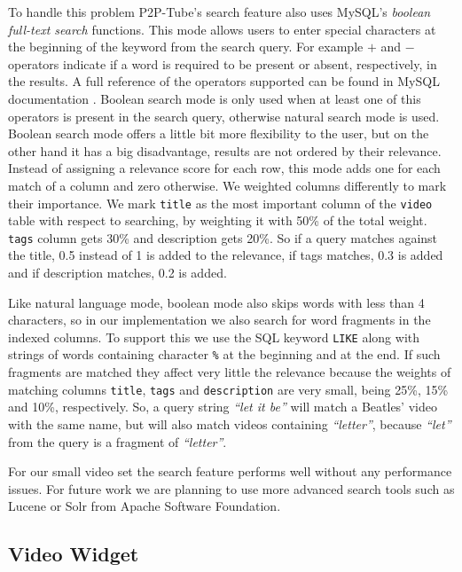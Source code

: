 To handle this problem P2P-Tube's search feature also uses MySQL's \textit{boolean full-text search} functions. This mode allows users to enter special characters at the beginning of the keyword from the search query. For example $+$ and $-$ operators indicate if a word is required to be present or absent, respectively, in the results. A full reference of the operators supported can be found in MySQL documentation \cite{mysql-boolean-search}. Boolean search mode is only used when at least one of this operators is present in the search query, otherwise natural search mode is used. Boolean search mode offers a little bit more flexibility to the user, but on the other hand it has a big disadvantage, results are not ordered by their relevance. Instead of assigning a relevance score for each row, this mode adds one for each match of a column and zero otherwise. We weighted columns differently to mark their importance. We mark \texttt{title} as the most important column of the \texttt{video} table with respect to searching, by weighting it with 50\% of the total weight. \texttt{tags} column gets 30\% and description gets 20\%. So if a query matches against the title, 0.5 instead of 1 is added to the relevance, if tags matches, 0.3 is added and if description matches, 0.2 is added.

Like natural language mode, boolean mode also skips words with less than 4 characters, so in our implementation we also search for word fragments in the indexed columns. To support this we use the SQL keyword \texttt{LIKE} along with strings of words containing character \texttt{\%} at the beginning and at the end. If such fragments are matched they affect very little the relevance because the weights of matching columns \texttt{title}, \texttt{tags} and \texttt{description} are very small, being 25\%, 15\% and 10\%, respectively. So, a query string \textit{``let it be''} will match a Beatles' video with the same name, but will also match videos containing \textit{``letter''}, because \textit{``let''} from the query is a fragment of \textit{``letter''}.

For our small video set the search feature performs well without any performance issues. For future work we are planning to use more advanced search tools such as Lucene or Solr from Apache Software Foundation.

\subsection{Video Widget}
\label{subsec:video-widget}

